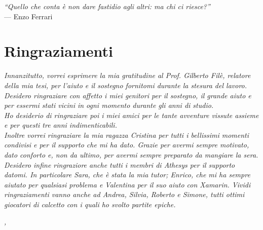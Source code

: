 
\cleardoublepage
{}
{}

\begin{flushright}{
	\slshape    
	``Quello che conta è non dare fastidio agli altri: ma chi ci riesce?''} \\ 
	\medskip
    --- Enzo Ferrari
\end{flushright}


\bigskip

\begingroup
\let\clearpage\relax
\let\cleardoublepage\relax
\let\cleardoublepage\relax

\chapter*{Ringraziamenti}

\noindent \textit{Innanzitutto, vorrei esprimere la mia gratitudine al Prof. Gilberto Filè, relatore della mia tesi, per l'aiuto e il sostegno fornitomi durante la stesura del lavoro.}\\

\noindent \textit{Desidero ringraziare con affetto i miei genitori per il sostegno, il grande aiuto e per essermi stati vicini in ogni momento durante gli anni di studio.}\\

\noindent \textit{Ho desiderio di ringraziare poi i miei amici per le tante avventure vissute assieme e per questi tre anni indimenticabili.}\\

\noindent \textit{Inoltre vorrei ringraziare la mia ragazza Cristina per tutti i bellissimi momenti condivisi e per il supporto che mi ha dato. Grazie per avermi sempre motivato, dato conforto e, non da ultimo, per avermi sempre preparato da mangiare la sera.}\\

\noindent \textit{Desidero infine ringraziore anche tutti i membri di \emph{Athesys} per il supporto datomi. In particolare Sara, che è stata la mia tutor; Enrico, che mi ha sempre aiutato per qualsiasi problema e Valentina per il suo aiuto con Xamarin. Vividi ringraziamenti vanno anche ad Andrea, Silvia, Roberto e Simone, tutti ottimi giocatori di calcetto con i quali ho svolto partite epiche.}
\bigskip

\noindent\textit{\myLocation, \myTime}
\hfill \myName

\endgroup

